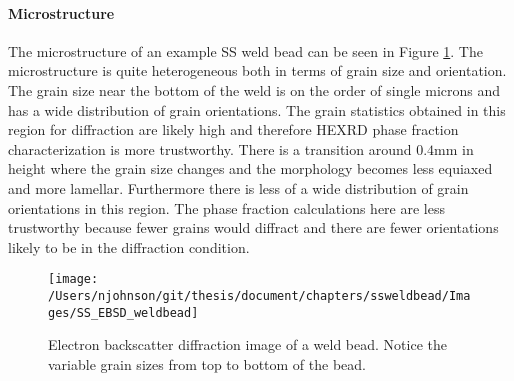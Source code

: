 \paragraph{Microstructure}
The microstructure of an example SS weld bead can be seen in Figure \ref{SS_EBSD_weldbead}. The microstructure is quite heterogeneous both in terms of grain size and orientation. The grain size near the bottom of the weld is on the order of single microns and has a wide distribution of grain orientations. The grain statistics obtained in this region for diffraction are likely high and therefore HEXRD phase fraction characterization is more trustworthy. There is a transition around $0.4$mm in height where the grain size changes and the morphology becomes less equiaxed and more lamellar. Furthermore there is less of a wide distribution of grain orientations in this region. The phase fraction calculations here are less trustworthy because fewer grains would diffract and there are fewer orientations likely to be in the diffraction condition.

\begin{figure}
\begin{center}
	\texttt{[image: /Users/njohnson/git/thesis/document/chapters/ssweldbead/Images/SS\_EBSD\_weldbead]}
	\caption{Electron backscatter diffraction image of a weld bead. Notice the variable grain sizes from top to bottom of the bead.}
	\label{SS_EBSD_weldbead}
\end{center}
\end{figure}
